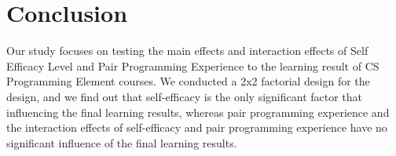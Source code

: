 \documentclass{sigchi}
\begin{document}
\section{Conclusion}
Our study focuses on testing the main effects and interaction effects of Self Efficacy Level and Pair Programming Experience to the learning result of CS Programming Element courses. We conducted a 2x2 factorial design for the design, and we find out that self-efficacy is the only significant factor that influencing the final learning results, whereas pair programming experience and the interaction effects of self-efficacy and pair programming experience have no significant influence of the final learning results.


%
%
%
%
\end{document}
